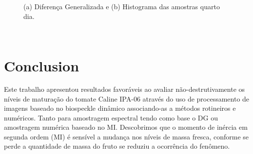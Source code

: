 \documentclass{elsarticle}
\begin{document}
\begin{figure}[h!]
\centering
{}
\qquad
{}
\qquad
\caption{(a) Diferença Generalizada e (b) Histograma das amostras quarto dia.}
\label{atividades4}
\end{figure}
\begin{figure}[h!]
\centering
{}
\qquad
{}
\label{atividades5}
\end{figure}
\\
\newpage

\section{Conclusion}
Este trabalho apresentou resultados favoráveis ao avaliar não-destrutivamente os níveis de maturação do tomate Caline IPA-06 através do uso de processamento de imagens baseado no biospeckle dinâmico associando-as a métodos rotineiros e numéricos. Tanto para amostragem espectral tendo como base o DG ou amostragem numérica baseado no MI. Descobrimos que o momento de inércia em segunda ordem (MI) é sensível a mudança nos níveis de massa fresca, conforme se perde a quantidade de massa do fruto se reduziu a ocorrência do fenômeno.


\end{document}
